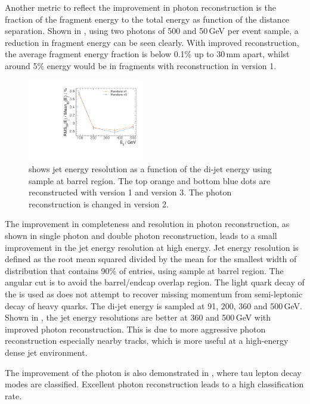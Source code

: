 Another metric to reflect the improvement in photon reconstruction is the fraction of the fragment energy to the total energy as function of the distance separation. Shown in , using two photons of 500 and 50\,GeV per event sample, a reduction in fragment energy can be seen clearly. With improved reconstruction, the average fragment energy fraction is below 0.1\% up to 30\,mm apart, whilst around 5\% energy would be in fragments with reconstruction in \pandora version 1.




\begin{figure}[tbph]
\centering
\includegraphics[width=0.45\textwidth]{photon/JERnew.pdf}
\caption[Jet energy resolution as a function of the di-jet energy]
{ shows jet energy resolution as a function of the di-jet energy using \Zuds sample at barrel region. The top orange and bottom blue dots are reconstructed with \pandora version 1 and version 3. The photon reconstruction is changed in \pandora version 2.}
\label{fig:photonJER}
\end{figure}

The improvement in completeness and resolution in photon reconstruction, as shown in single photon and double photon reconstruction, leads to a small improvement in the jet energy resolution at high energy. Jet energy resolution is defined as the root mean squared divided by the mean for the smallest width of distribution that contains 90\% of entries, using \Zuds sample at barrel region. The angular cut is to avoid the barrel/endcap overlap region. The light quark decay of the \PZ is used as \pandora does not attempt to recover missing momentum from semi-leptonic decay of heavy quarks. The di-jet energy is sampled at 91, 200, 360 and 500\,GeV. Shown in , the jet energy resolutions are better at 360 and 500\,GeV with improved photon reconstruction. This is due to more aggressive photon reconstruction especially nearby tracks, which is more useful at a high-energy dense jet environment.

The improvement of the photon is also demonstrated in , where tau lepton decay modes are classified. Excellent photon reconstruction leads to a high classification rate.

